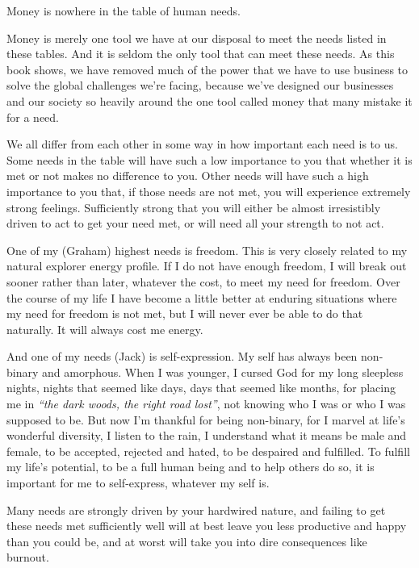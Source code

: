 Money is nowhere in the table of human needs. 


Money is merely one tool we have at our disposal to meet the needs listed in these tables. And it is seldom the only tool that can meet these needs. As this book shows, we have removed much of the power that we have to use business to solve the global challenges we're facing, because we've designed our businesses and our society so heavily around the one tool called money  that many mistake it for a need.


We all differ from each other in some way in how important each need is to us. Some needs in the table will have such a low importance to you that whether it is met or not makes no difference to you. Other needs will have such a high importance to you that, if those needs are not met, you will experience extremely strong feelings. Sufficiently strong that you will either be almost irresistibly driven to act to get your need met, or will need all your strength to not act.


\begin{longstoryblock}
One of my (Graham) highest needs is freedom. This is very closely related to my natural explorer energy profile. If I do not have enough freedom,  I will break out sooner rather than later, whatever the cost, to meet my need for freedom. Over the course of my life I have become a little better at enduring situations where my need for freedom is not met, but I will never ever be able to do that naturally. It will always cost me energy. 


And one of my needs (Jack) is self-expression. My self has always been non-binary and amorphous. When I was younger, I cursed God for my long sleepless nights, nights that seemed like days, days that seemed like months, for placing me in \emph{“the dark woods, the right road lost”}\cite{dante-inferno}, not knowing who I was or who I was supposed to be. But now I’m thankful for being non-binary, for I marvel at life’s wonderful diversity, I listen to the rain, I understand what it means be male and female, to be accepted, rejected and hated, to be despaired and fulfilled.  To fulfill my life’s potential, to be a full human being and to help others do so, it is important for me to self-express, whatever my self is.
\end{longstoryblock}


Many needs are strongly driven by your hardwired nature, and failing to get these needs met sufficiently well will at best leave you less productive and happy than you could be, and at worst will take you into dire consequences like burnout.


